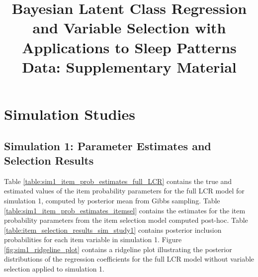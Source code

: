 \documentclass[11pt]{article}
\title{Bayesian Latent Class Regression and Variable Selection with
Applications to Sleep Patterns Data: Supplementary Material}
\author{}
\date{}
\theoremstyle{plain}
\theoremstyle{definition}
\begin{document}
\maketitle
\tableofcontents

\section{Simulation Studies}
\subsection{Simulation 1: Parameter Estimates and Selection Results}

Table \ref{table:sim1_item_prob_estimates_full_LCR} contains the true and estimated values of the item probability parameters for the full LCR model for simulation 1, computed by posterior mean from Gibbs sampling. Table \ref{table:sim1_item_prob_estimates_itemsel} contains the estimates for the item probability parameters from the item selection model computed post-hoc. Table \ref{table:item_selection_results_sim_study1} contains posterior inclusion probabilities for each item variable in simulation 1. Figure \ref{fig:sim1_ridgeline_plot} contains a ridgeline plot illustrating the posterior distributions of the regression coefficients for the full LCR model without variable selection applied to simulation 1.
\end{document}
